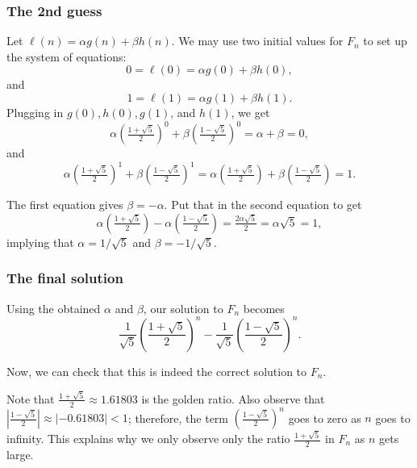\begin{frame}\frametitle{The 2nd guess}
  Let $\ell(n) = \alpha g(n) + \beta h(n)$.  We may use two initial
  values for $F_n$ to set up the system of equations:
  \[ 0 = \ell(0) = \alpha g(0) + \beta h(0), \]
  and
  \[ 1 = \ell(1) = \alpha g(1) + \beta h(1).\]
  Plugging in $g(0),h(0),g(1)$, and $h(1)$, we get
  \[ \alpha\left(\tfrac{1+\sqrt{5}}{2}\right)^0 +
  \beta\left(\tfrac{1-\sqrt{5}}{2}\right)^0  = \alpha + \beta = 0, \]
  and
  \[ \alpha\left(\tfrac{1+\sqrt{5}}{2}\right)^1 +
  \beta\left(\tfrac{1-\sqrt{5}}{2}\right)^1 =
  \alpha\left(\tfrac{1+\sqrt{5}}{2}\right) +
  \beta\left(\tfrac{1-\sqrt{5}}{2}\right)  = 1. \]

  The first equation gives $\beta = -\alpha$.  Put that in the second
  equation to get
  \[
  \alpha\left(\tfrac{1+\sqrt{5}}{2}\right)
  -\alpha\left(\tfrac{1-\sqrt{5}}{2}\right)  =
  \tfrac{2\alpha\sqrt{5}}{2} = \alpha\sqrt{5} = 1,
  \]
  implying that $\alpha=1/\sqrt{5}$ and $\beta=-1/\sqrt{5}$.
\end{frame}

\begin{frame}\frametitle{The final solution}
  Using the obtained $\alpha$ and $\beta$, our solution to $F_n$
  becomes
  \[ \frac{1}{\sqrt{5}}\left(\frac{1+\sqrt{5}}{2}\right)^n
  - \frac{1}{\sqrt{5}}\left(\frac{1-\sqrt{5}}{2}\right)^n. \]

  Now, we can check that this is indeed the correct solution to $F_n$.

  \vspace{0.2in} Note that $\tfrac{1+\sqrt{5}}{2}\approx 1.61803$ is
  the golden ratio.  Also observe that $|\tfrac{1-\sqrt{5}}{2}|\approx
  |-0.61803|<1$; therefore, the term
  $\left(\tfrac{1-\sqrt{5}}{2}\right)^n$ goes to zero as $n$ goes to
  infinity.  This explains why we only observe only the ratio
  $\tfrac{1+\sqrt{5}}{2}$ in $F_n$ as $n$ gets large.
\end{frame}
